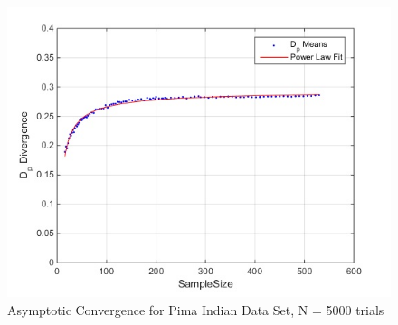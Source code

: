 \documentclass{article}
\begin{document}
	\begin{figure}[!h]
		\caption{Asymptotic Convergence for Pima Indian Data Set, N = 5000 trials}
		\centering
		\includegraphics[scale=0.6]{dp_n5000}
	\end{figure}	
	
	
\end{document}
